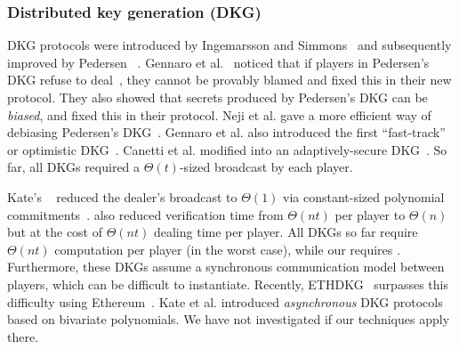 \subsubsection{Distributed key generation (DKG)}
DKG protocols were introduced by Ingemarsson and Simmons~\cite{Ingemarsson1991} and subsequently improved by Pedersen ~\cite{Pedersen1991AThreshold,Pedersen1991Noninteractive}.
Gennaro et al.~\cite{dkg} noticed that if players in Pedersen's DKG refuse to deal~\cite{Pedersen1991AThreshold}, they cannot be provably blamed and fixed this in their new \jfdkg protocol.
They also showed that secrets produced by Pedersen's DKG can be \textit{biased}, and fixed this in their \newdkg protocol.
Neji et al. gave a more efficient way of debiasing Pedersen's DKG~\cite{NBB16}.
Gennaro et al. also introduced the first ``fast-track'' or optimistic DKG~\cite{GRR98p}.
Canetti et al. modified \newdkg into an adaptively-secure DKG~\cite{Canetti1999Adaptive}.
So far, all DKGs required a $\Theta(t)$-sized broadcast by each player.

Kate's \ejfdkg~\cite{Kate2010Distributed} reduced the dealer's broadcast to $\Theta(1)$ via constant-sized polynomial commitments~\cite{polycommit}.
\ejfdkg also reduced verification time from $\Theta(nt)$ per player to $\Theta(n)$ but at the cost of $\Theta(nt)$ dealing time per player.
All DKGs so far require $\Theta(nt)$ computation per player (in the worst case), while our \ourdkg requires \amtDealTime.
Furthermore, these DKGs assume a synchronous communication model between players, which can be difficult to instantiate.
Recently, ETHDKG~\cite{SJSW19} surpasses this difficulty using Ethereum~\cite{ethereum}.
Kate et al. introduced \textit{asynchronous} DKG protocols~\cite{Kate2010Distributed,KateGoldberg2009Distributed} based on bivariate polynomials.
We have not investigated if our techniques apply there.

